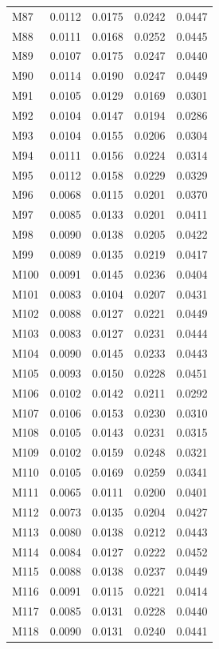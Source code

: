 \begin{longtable}{lrrrr}
M87 & 0.0112 & 0.0175 & 0.0242 & 0.0447 \\
M88 & 0.0111 & 0.0168 & 0.0252 & 0.0445 \\
M89 & 0.0107 & 0.0175 & 0.0247 & 0.0440 \\
M90 & 0.0114 & 0.0190 & 0.0247 & 0.0449 \\
M91 & 0.0105 & 0.0129 & 0.0169 & 0.0301 \\
M92 & 0.0104 & 0.0147 & 0.0194 & 0.0286 \\
M93 & 0.0104 & 0.0155 & 0.0206 & 0.0304 \\
M94 & 0.0111 & 0.0156 & 0.0224 & 0.0314 \\
M95 & 0.0112 & 0.0158 & 0.0229 & 0.0329 \\
M96 & 0.0068 & 0.0115 & 0.0201 & 0.0370 \\
M97 & 0.0085 & 0.0133 & 0.0201 & 0.0411 \\
M98 & 0.0090 & 0.0138 & 0.0205 & 0.0422 \\
M99 & 0.0089 & 0.0135 & 0.0219 & 0.0417 \\
M100 & 0.0091 & 0.0145 & 0.0236 & 0.0404 \\
M101 & 0.0083 & 0.0104 & 0.0207 & 0.0431 \\
M102 & 0.0088 & 0.0127 & 0.0221 & 0.0449 \\
M103 & 0.0083 & 0.0127 & 0.0231 & 0.0444 \\
M104 & 0.0090 & 0.0145 & 0.0233 & 0.0443 \\
M105 & 0.0093 & 0.0150 & 0.0228 & 0.0451 \\
M106 & 0.0102 & 0.0142 & 0.0211 & 0.0292 \\
M107 & 0.0106 & 0.0153 & 0.0230 & 0.0310 \\
M108 & 0.0105 & 0.0143 & 0.0231 & 0.0315 \\
M109 & 0.0102 & 0.0159 & 0.0248 & 0.0321 \\
M110 & 0.0105 & 0.0169 & 0.0259 & 0.0341 \\
M111 & 0.0065 & 0.0111 & 0.0200 & 0.0401 \\
M112 & 0.0073 & 0.0135 & 0.0204 & 0.0427 \\
M113 & 0.0080 & 0.0138 & 0.0212 & 0.0443 \\
M114 & 0.0084 & 0.0127 & 0.0222 & 0.0452 \\
M115 & 0.0088 & 0.0138 & 0.0237 & 0.0449 \\
M116 & 0.0091 & 0.0115 & 0.0221 & 0.0414 \\
M117 & 0.0085 & 0.0131 & 0.0228 & 0.0440 \\
M118 & 0.0090 & 0.0131 & 0.0240 & 0.0441 \\

\end{longtable}
